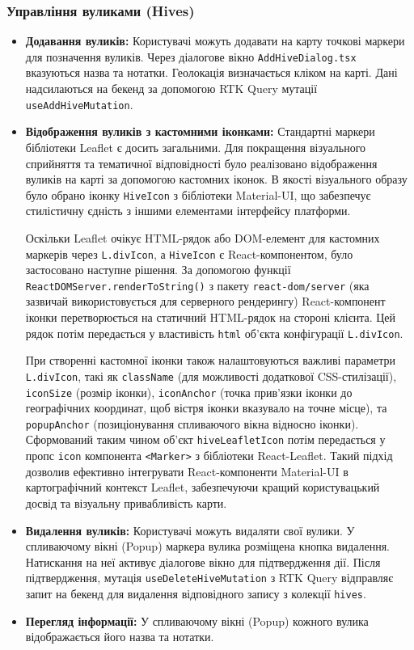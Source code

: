 \subsubsection{Управління вуликами (Hives)}
\begin{itemize}
    \item \textbf{Додавання вуликів:} Користувачі можуть додавати на карту точкові маркери для позначення вуликів. Через діалогове вікно \texttt{AddHiveDialog.tsx} вказуються назва та нотатки. Геолокація визначається кліком на карті. Дані надсилаються на бекенд за допомогою RTK Query мутації \texttt{useAddHiveMutation}.
    
    \item \textbf{Відображення вуликів з кастомними іконками:} 
    Стандартні маркери бібліотеки Leaflet є досить загальними. Для покращення візуального сприйняття та тематичної відповідності було реалізовано відображення вуликів на карті за допомогою кастомних іконок. В якості візуального образу було обрано іконку \texttt{HiveIcon} з бібліотеки Material-UI, що забезпечує стилістичну єдність з іншими елементами інтерфейсу платформи. 
    
    Оскільки Leaflet очікує HTML-рядок або DOM-елемент для кастомних маркерів через \texttt{L.divIcon}, а \texttt{HiveIcon} є React-компонентом, було застосовано наступне рішення. За допомогою функції \texttt{ReactDOMServer.renderToString()} з пакету \texttt{react-dom/server} (яка зазвичай використовується для серверного рендерингу) React-компонент іконки перетворюється на статичний HTML-рядок на стороні клієнта. Цей рядок потім передається у властивість \texttt{html} об'єкта конфігурації \texttt{L.divIcon}. 
    
    При створенні кастомної іконки також налаштовуються важливі параметри \texttt{L.divIcon}, такі як \texttt{className} (для можливості додаткової CSS-стилізації), \texttt{iconSize} (розмір іконки), \texttt{iconAnchor} (точка прив'язки іконки до географічних координат, щоб вістря іконки вказувало на точне місце), та \texttt{popupAnchor} (позиціонування спливаючого вікна відносно іконки). Сформований таким чином об'єкт \texttt{hiveLeafletIcon} потім передається у пропс \texttt{icon} компонента \texttt{<Marker>} з бібліотеки React-Leaflet. Такий підхід дозволив ефективно інтегрувати React-компоненти Material-UI в картографічний контекст Leaflet, забезпечуючи кращий користувацький досвід та візуальну привабливість карти.

    \item \textbf{Видалення вуликів:} Користувачі можуть видаляти свої вулики. У спливаючому вікні (Popup) маркера вулика розміщена кнопка видалення. Натискання на неї активує діалогове вікно для підтвердження дії. Після підтвердження, мутація \texttt{useDeleteHiveMutation} з RTK Query відправляє запит на бекенд для видалення відповідного запису з колекції \texttt{hives}.
    \item \textbf{Перегляд інформації:} У спливаючому вікні (Popup) кожного вулика відображається його назва та нотатки.
\end{itemize}

